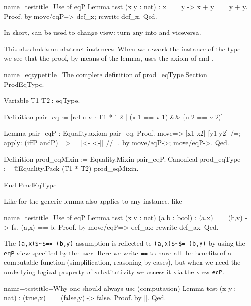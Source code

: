 \begin{coq}{name=test}{title=Use of eqP}
Lemma test (x y : nat) : x == y -> x + y == y + y.
Proof. by move/eqP=> def_x; rewrite def_x. Qed.
\end{coq}

In short,  can be used to change view: turn any
\C{==} into \C{=} and viceversa.

This also holds on
abstract instances.
When we rework the instance of the type  we see that the
proof, by means of the  lemma, uses the axiom of  and
.

\begin{coq}{name=eqtype}{title=The complete definition of prod\_eqType}
Section ProdEqType.

Variable T1 T2 : eqType.

Definition pair_eq := [rel u v : T1 * T2 | (u.1 == v.1) && (u.2 == v.2)].

Lemma pair_eqP : Equality.axiom pair_eq.
Proof.
move=> [x1 x2] [y1 y2] /=; apply: (iffP andP) => [[]|[<- <-]] //=.
by move/eqP->; move/eqP->.
Qed.

Definition prod_eqMixin := Equality.Mixin pair_eqP.
Canonical prod_eqType := @Equality.Pack (T1 * T2) prod_eqMixin.

End ProdEqType.
\end{coq}

Like for  the generic lemma  also applies to
any  instance, like 

\begin{coq}{name=test}{title=Use of eqP}
Lemma test (x y : nat) (a b : bool) : (a,x) == (b,y) -> fst (a,x) == b.
Proof. by move/eqP=> def_ax; rewrite def_ax. Qed.
\end{coq}

The \lstinline/(a,x)$~$== (b,y)/ assumption is reflected to
\lstinline/(a,x)$~$= (b,y)/ by using the \lstinline/eqP/ view
specified by the user.  Here we write \lstinline/==/ to have
all the benefits of a computable function (simplification, reasoning
by cases), but when we need the underlying logical property of
substitutivity we access it via the view \lstinline/eqP/.

\begin{coq}{name=test}{title=Why one should always use \C{==}
	(computation)}
Lemma test (x y : nat) : (true,x) == (false,y) -> false.
Proof. by []. Qed.
\end{coq}


